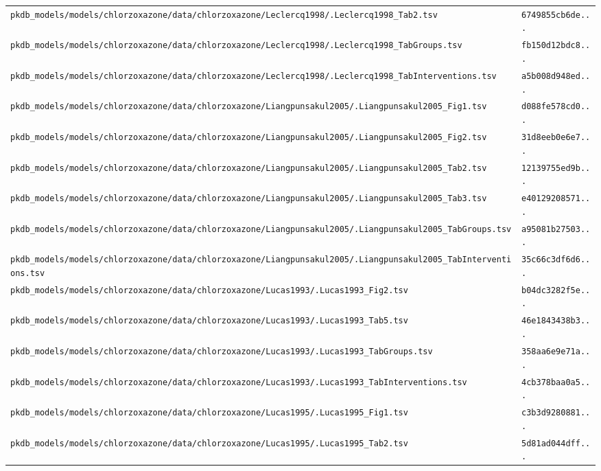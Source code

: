 \begin{longtable}{ll}
\texttt{pkdb\_models/models/chlorzoxazone/data/chlorzoxazone/Leclercq1998/.Leclercq1998\_Tab2.tsv} & \texttt{6749855cb6de...} \\
\texttt{pkdb\_models/models/chlorzoxazone/data/chlorzoxazone/Leclercq1998/.Leclercq1998\_TabGroups.tsv} & \texttt{fb150d12bdc8...} \\
\texttt{pkdb\_models/models/chlorzoxazone/data/chlorzoxazone/Leclercq1998/.Leclercq1998\_TabInterventions.tsv} & \texttt{a5b008d948ed...} \\
\texttt{pkdb\_models/models/chlorzoxazone/data/chlorzoxazone/Liangpunsakul2005/.Liangpunsakul2005\_Fig1.tsv} & \texttt{d088fe578cd0...} \\
\texttt{pkdb\_models/models/chlorzoxazone/data/chlorzoxazone/Liangpunsakul2005/.Liangpunsakul2005\_Fig2.tsv} & \texttt{31d8eeb0e6e7...} \\
\texttt{pkdb\_models/models/chlorzoxazone/data/chlorzoxazone/Liangpunsakul2005/.Liangpunsakul2005\_Tab2.tsv} & \texttt{12139755ed9b...} \\
\texttt{pkdb\_models/models/chlorzoxazone/data/chlorzoxazone/Liangpunsakul2005/.Liangpunsakul2005\_Tab3.tsv} & \texttt{e40129208571...} \\
\texttt{pkdb\_models/models/chlorzoxazone/data/chlorzoxazone/Liangpunsakul2005/.Liangpunsakul2005\_TabGroups.tsv} & \texttt{a95081b27503...} \\
\texttt{pkdb\_models/models/chlorzoxazone/data/chlorzoxazone/Liangpunsakul2005/.Liangpunsakul2005\_TabInterventions.tsv} & \texttt{35c66c3df6d6...} \\
\texttt{pkdb\_models/models/chlorzoxazone/data/chlorzoxazone/Lucas1993/.Lucas1993\_Fig2.tsv} & \texttt{b04dc3282f5e...} \\
\texttt{pkdb\_models/models/chlorzoxazone/data/chlorzoxazone/Lucas1993/.Lucas1993\_Tab5.tsv} & \texttt{46e1843438b3...} \\
\texttt{pkdb\_models/models/chlorzoxazone/data/chlorzoxazone/Lucas1993/.Lucas1993\_TabGroups.tsv} & \texttt{358aa6e9e71a...} \\
\texttt{pkdb\_models/models/chlorzoxazone/data/chlorzoxazone/Lucas1993/.Lucas1993\_TabInterventions.tsv} & \texttt{4cb378baa0a5...} \\
\texttt{pkdb\_models/models/chlorzoxazone/data/chlorzoxazone/Lucas1995/.Lucas1995\_Fig1.tsv} & \texttt{c3b3d9280881...} \\
\texttt{pkdb\_models/models/chlorzoxazone/data/chlorzoxazone/Lucas1995/.Lucas1995\_Tab2.tsv} & \texttt{5d81ad044dff...} \\

\end{longtable}
